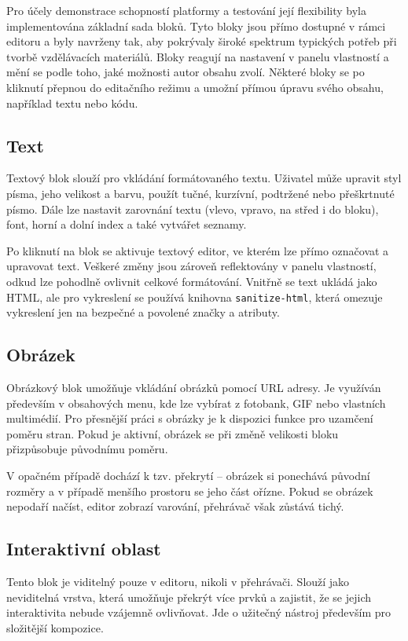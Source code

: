 Pro účely demonstrace schopností platformy a testování její flexibility byla implementována základní sada bloků.
Tyto bloky jsou přímo dostupné v rámci editoru a byly navrženy tak, aby pokrývaly široké spektrum typických potřeb při tvorbě vzdělávacích materiálů. 
Bloky reagují na nastavení v panelu vlastností a mění se podle toho, jaké možnosti autor obsahu zvolí. 
Některé bloky se po kliknutí přepnou do editačního režimu a umožní přímou úpravu svého obsahu, například textu nebo kódu. 

\subsection{Text}

Textový blok slouží pro vkládání formátovaného textu. 
Uživatel může upravit styl písma, jeho velikost a barvu, použít tučné, kurzívní, podtržené nebo přeškrtnuté písmo. 
Dále lze nastavit zarovnání textu (vlevo, vpravo, na střed i do bloku), font, horní a dolní index a také vytvářet seznamy. 

Po kliknutí na blok se aktivuje textový editor, ve kterém lze přímo označovat a upravovat text. 
Veškeré změny jsou zároveň reflektovány v panelu vlastností, odkud lze pohodlně ovlivnit celkové formátování. 
Vnitřně se text ukládá jako HTML, ale pro vykreslení se používá knihovna \texttt{sanitize-html}, která omezuje vykreslení jen na bezpečné a povolené značky a atributy.

\subsection{Obrázek}

Obrázkový blok umožňuje vkládání obrázků pomocí URL adresy. 
Je využíván především v obsahových menu, kde lze vybírat z fotobank, GIF nebo vlastních multimédií. 
Pro přesnější práci s obrázky je k dispozici funkce pro uzamčení poměru stran. 
Pokud je aktivní, obrázek se při změně velikosti bloku přizpůsobuje původnímu poměru. 

V opačném případě dochází k tzv. překrytí -- obrázek si ponechává původní rozměry a v případě menšího prostoru se jeho část ořízne.
Pokud se obrázek nepodaří načíst, editor zobrazí varování, přehrávač však zůstává tichý.

\subsection{Interaktivní oblast}

Tento blok je viditelný pouze v editoru, nikoli v přehrávači.
Slouží jako neviditelná vrstva, která umožňuje překrýt více prvků a zajistit, že se jejich interaktivita nebude vzájemně ovlivňovat.
Jde o užitečný nástroj především pro složitější kompozice.

